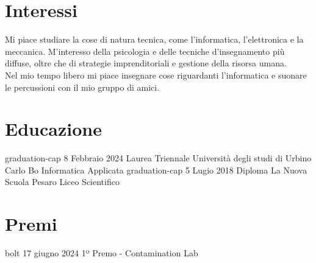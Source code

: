 \documentclass[icon]{twentysecondcv}
\begin{document}
	
	\section{Interessi}
	Mi piace studiare la cose di natura tecnica, come l'informatica, l'elettronica e la meccanica. M'interesso della psicologia e delle tecniche d'insegnamento più diffuse, oltre che di strategie imprenditoriali e gestione della risorsa umana. \\
	Nel mio tempo libero mi piace insegnare cose riguardanti l'informatica e suonare le percussioni con il mio gruppo di amici. 
	
	\section{Educazione}
	
	\begin{twentyicon}   
		\twentyitemicon
		{graduation-cap}
		{8 Febbraio 2024}
		{Laurea Triennale}
		{Università degli studi di Urbino Carlo Bo\hspace*{3mm}}
		{Informatica Applicata}
		\twentyitemicon
		{graduation-cap}
		{5 Lugio 2018}
		{Diploma}
		{La Nuova Scuola Pesaro\hspace*{3mm}}
		{Liceo Scientifico}
	\end{twentyicon}
	
	
	
	\section{Premi}
	\begin{twentyshorticon}
		\twentyitemshorticon
		{bolt}
		{17 giugno 2024}
		{1º Premo - Contamination Lab}
	\end{twentyshorticon}
	
\end{document}
